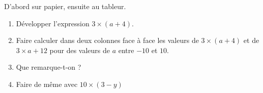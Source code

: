 
\begin{exercice}\label{exo2smath-0210}

    D'abord sur papier, ensuite au tableur.

    \begin{enumerate}
        \item
            Développer l'expression \( 3\times (a+4)\).
        \item
            Faire calculer dans deux colonnes face à face les valeurs de \( 3\times (a+4)\) et de \( 3\times a+12\) pour des valeurs de \( a\) entre \( -10\) et \( 10\).
        \item
            Que remarque-t-on ?
        \item
            Faire de même avec \( 10\times (3-y)\)
    \end{enumerate}

\end{exercice}
